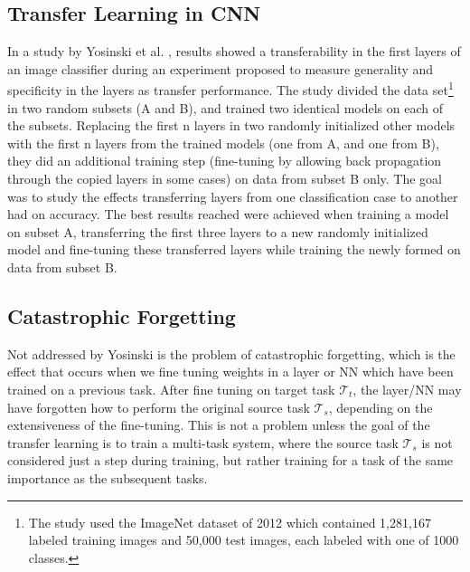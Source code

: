 \documentclass[a4paper,english]{report}
\begin{document}
\subsection{Transfer Learning in CNN}
In a study by Yosinski et al. \cite{yosinski2014transferable}, results showed a transferability in the first layers of an image classifier during an experiment proposed to measure generality and specificity in the layers as transfer performance. The study divided the data set\footnote{The study used the ImageNet dataset of 2012 which contained 1,281,167 labeled training images and 50,000 test images, each labeled with one of 1000 classes.} in two random subsets (A and B), and trained two identical models on each of the subsets. Replacing the first n layers in two randomly initialized other models with the first n layers from the trained models (one from A, and one from B), they did an additional training step (fine-tuning by allowing back propagation through the copied layers in some cases) on data from subset B only. The goal was to study the effects transferring layers from one classification case to another had on accuracy. The best results reached were achieved when training a model on subset A, transferring the first three layers to a new randomly initialized model and fine-tuning these transferred layers while training the newly formed on data from subset B. 

\subsection{Catastrophic Forgetting}\label{catastrophicforgetting}
Not addressed by Yosinski is the problem of catastrophic forgetting, which is the effect that occurs when we fine tuning weights in a layer or NN which have been trained on a previous task. After fine tuning on target task \(\mathcal{T}_t\), the layer/NN may have forgotten how to perform the original source task \(\mathcal{T}_s\), depending on the extensiveness of the fine-tuning. This is not a problem unless the goal of the transfer learning is to train a multi-task system, where the source task \(\mathcal{T}_s\) is not considered just a step during training, but rather training for a task of the same importance as the subsequent tasks.
\end{document}
